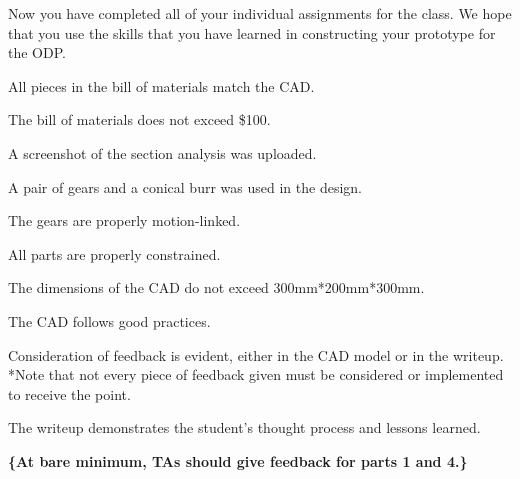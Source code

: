 \documentclass[11pt,letterpaper]{article}
\begin{document}
Now you have completed all of your individual assignments for the class. We hope that you use the
skills that you have learned in constructing your prototype for the ODP.

\newpage
{}
\begin{Checklist}
  \item All pieces in the bill of materials match the CAD.
  \item The bill of materials does not exceed \$100.
  \item A screenshot of the section analysis was uploaded.
  \item A pair of gears and a conical burr was used in the design.
  \item The gears are properly motion-linked.
  \item All parts are properly constrained.
  \item The dimensions of the CAD do not exceed 300mm*200mm*300mm.
  \item The CAD follows good practices.
  \item Consideration of feedback is evident, either in the CAD model or in the writeup. *Note that
    not every piece of feedback given must be considered or implemented to receive the point.
  \item The writeup demonstrates the student's thought process and lessons learned.
\end{Checklist}

\textbf{\{At bare minimum, TAs should give feedback for parts 1 and 4.\}}
\end{document}
